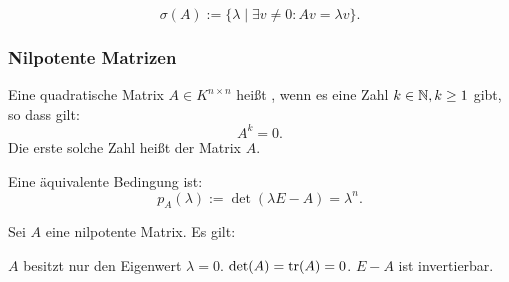 \begin{equation}
\sigma(A) := \{\lambda\mid \exists v\ne 0\colon Av=\lambda v\}.
\end{equation}

\subsubsection{Nilpotente Matrizen}
\begin{definition}\mbox{}\newline
Eine quadratische Matrix $A\in K^{n\times n}$ heißt ,
wenn es eine Zahl $k\in\mathbb N, k\ge 1$ gibt, so dass gilt:
\begin{equation}
A^k=0.
\end{equation}
Die erste solche Zahl heißt  der Matrix $A$.

Eine äquivalente Bedingung ist:
\begin{equation}
p_A(\lambda):=\det(\lambda E-A)=\lambda^n.
\end{equation}
\end{definition}

\noindent
{}
Sei $A$ eine nilpotente Matrix. Es gilt:
\begin{itemize}[itemsep=0pt, leftmargin=3em]
\bitem $A$ besitzt nur den Eigenwert $\lambda=0$.
\bitem $\det(A)=\operatorname{tr}(A)=0$.
\bitem $E-A$ ist invertierbar.
\end{itemize}


